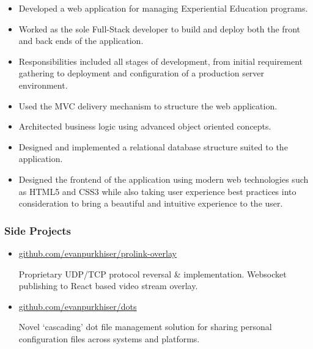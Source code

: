 \documentclass[letterpaper,10pt]{article}
\begin{document}
\begin{itemize}
\tightlist{}
\item
  Developed a web application for managing Experiential Education
  programs.
\item
  Worked as the sole Full-Stack developer to build and deploy both the front
  and back ends of the application.
\item
  Responsibilities included all stages of development, from initial
  requirement gathering to deployment and configuration of a production
  server environment.
\item
  Used the MVC delivery mechanism to structure the web application.
\item
  Architected business logic using advanced object oriented concepts.
\item
  Designed and implemented a relational database structure suited to the
  application.
\item
  Designed the frontend of the application using modern web technologies such
  as HTML5 and CSS3 while also taking user experience best practices into
  consideration to bring a beautiful and intuitive experience to the user.
\end{itemize}

\subsubsection{Side Projects}

\begin{itemize}
\item
  \href{https://github.com/evanpurkhiser/prolink-overlay}{github.com/evanpurkhiser/prolink-overlay}

  Proprietary UDP/TCP protocol reversal \& implementation. Websocket
  publishing to React based video stream overlay.
\item
  \href{https://github.com/evanpurkhiser/dots}{github.com/evanpurkhiser/dots}

  Novel `cascading' dot file management solution for sharing personal
  configuration files across systems and platforms.
\end{itemize}
\end{document}
